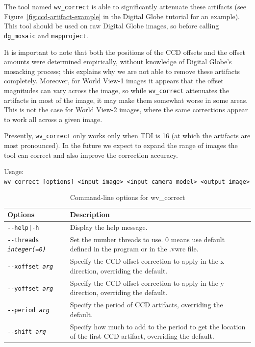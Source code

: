 The tool named \texttt{wv\_correct} is able to significantly attenuate
these artifacts (see Figure~\ref{fig:ccd-artifact-example} in the
Digital Globe tutorial for an example). This tool should be used on raw
Digital Globe images, so before calling \texttt{dg\_mosaic} and
\texttt{mapproject}. 

It is important to note that both the positions of the CCD offsets and
the offset amounts were determined empirically, without knowledge of
Digital Globe's mosacking process; this explains why we are not able to
remove these artifacts completely. Moreover, for World View-1 images it
appears that the offset magnitudes can vary across the image, so while
\texttt{wv\_correct} attenuates the artifacts in most of the image, it
may make them somewhat worse in some areas. This is not the case for
World View-2 images, where the same corrections appear to work all
across a given image.

Presently, \texttt{wv\_correct} only works only when TDI is 16 (at which
the artifacts are most pronounced). In the future we expect to expand
the range of images the tool can correct and also improve the correction
accuracy.

\medskip

Usage:\\
\hspace*{2em}\texttt{wv\_correct [options] <input image> <input camera model> <output image>}

\medskip

\begin{longtable}{|p{8cm}|p{9cm}|}
\caption{Command-line options for wv\_correct}
\label{tbl:wvcorrect}
\endfirsthead
\endhead
\endfoot
\endlastfoot
\hline
Options & Description \\ \hline \hline
\texttt{-\/-help|-h} & Display the help message.\\ \hline

\texttt{-\/-threads \textit{integer(=0)}} & Set the number threads to
use. 0 means use default defined in the program or in the .vwrc file. \\ \hline

\texttt{-\/-xoffset \textit{arg}} & Specify the CCD offset correction to
apply in the x direction, overriding the default. \\ \hline

\texttt{-\/-yoffset \textit{arg}} & Specify the CCD offset correction to
apply in the y direction, overriding the default. \\ \hline

\texttt{-\/-period \textit{arg}} & Specify the period of CCD artifacts,
overriding the default. \\ \hline

\texttt{-\/-shift \textit{arg}} & Specify how much to add to the period
to get the location of the first CCD artifact, overriding the
default. \\ \hline

\end{longtable}

